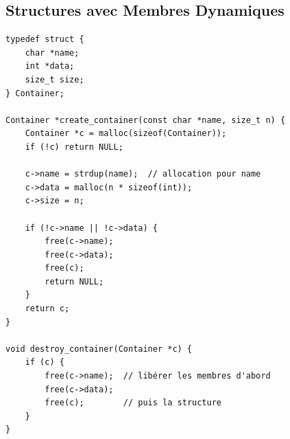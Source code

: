 \documentclass[10pt,a4paper]{article}
\begin{document}
\begin{center}
\end{center}

\subsection{Structures avec Membres Dynamiques}

\begin{lstlisting}
typedef struct {
    char *name;
    int *data;
    size_t size;
} Container;

Container *create_container(const char *name, size_t n) {
    Container *c = malloc(sizeof(Container));
    if (!c) return NULL;
    
    c->name = strdup(name);  // allocation pour name
    c->data = malloc(n * sizeof(int));
    c->size = n;
    
    if (!c->name || !c->data) {
        free(c->name);
        free(c->data);
        free(c);
        return NULL;
    }
    return c;
}

void destroy_container(Container *c) {
    if (c) {
        free(c->name);  // libérer les membres d'abord
        free(c->data);
        free(c);        // puis la structure
    }
}
\end{lstlisting}
\end{document}

